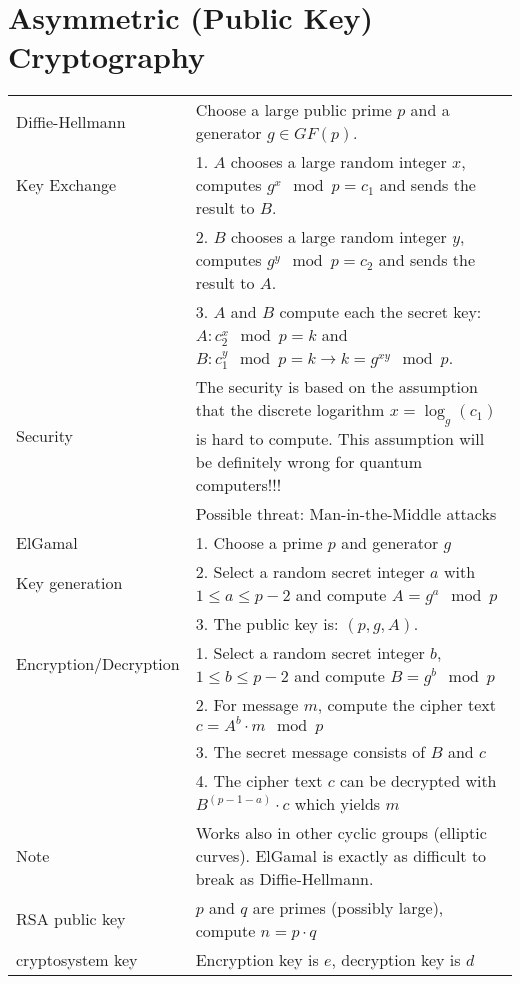 \section{Asymmetric (Public Key) Cryptography}
\label{sec::CrypCod_Asymmetric Crypto}
\begin{tabular}{|l| p{14.7cm}|}
	\hline
	Diffie-Hellmann				 	& 	Choose a large public prime $p$ and a generator $g \in GF(p)$.\\
	Key Exchange					&	1. $A$ chooses a large random integer $x$, computes $g^x \mod p = c_1$ and sends the result to $B$. \\
									&	2. $B$ chooses a large random integer $y$, computes $g^y \mod p = c_2$ and sends the result to $A$. \\
									&	3. $A$ and $B$ compute each the secret key: $A: c_2^x \mod p=k $ and $B: c_1^y \mod p=k \to k=g^{xy} \mod p$.\\
									\cline{2-2}
	Security        & 	The security is based on the assumption that the discrete logarithm $x=\log_{g}(c_1)$ is hard to compute. This assumption will be definitely wrong for quantum computers!!!\\
									& Possible threat: Man-in-the-Middle attacks\\
	\hline
	ElGamal 				& 1. Choose a prime $p$ and generator $g$\\
	Key generation  & 2. Select a random secret integer $a$ with $1 \leq a \leq p-2$ and compute $A=g^a \mod p$\\
	 								& 3. The public key is: $(p, g, A)$.\\
									\cline{2-2}
	Encryption/Decryption & 1. Select a random secret integer $b$, $1 \leq b \leq p-2$ and compute $B=g^b \mod p$\\
												& 2. For message $m$, compute the cipher text $c=A^b \cdot m \mod p$\\
												& 3. The secret message consists of $B$ and $c$\\
												& 4. The cipher text $c$ can be decrypted with $B^{(p-1-a)} \cdot c$ which yields $m$\\
									\cline{2-2}
	Note & Works also in other cyclic groups (elliptic curves). ElGamal is exactly as difficult to break as Diffie-Hellmann.\\
	\hline
	RSA public key 					&	$p$ and $q$ are primes (possibly large), compute $n=p\cdot q$\\
	cryptosystem key				& Encryption key is $e$, decryption key is $d$\\

\end{tabular}
